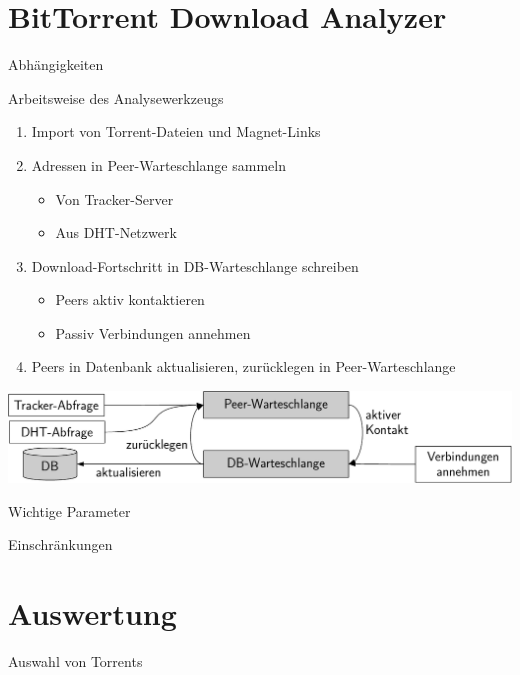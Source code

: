 \documentclass[dvipsnames]{beamer} %
\begin{document}
	\section{BitTorrent Download Analyzer}
	\begin{frame}{Abhängigkeiten}
	\end{frame}

	\begin{frame}{Arbeitsweise des Analysewerkzeugs}
		\begin{enumerate}
			\item \alert{Import} von Torrent-Dateien und Magnet-Links
			\item \alert{Adressen} in Peer-Warteschlange sammeln
			\begin{itemize}
				\item Von Tracker-Server
				\item Aus DHT-Netzwerk
			\end{itemize}
			\item \alert{Download-Fortschritt} in DB-Warteschlange schreiben
			\begin{itemize}
				\item Peers aktiv kontaktieren
				\item Passiv Verbindungen annehmen
			\end{itemize}
			\item Peers in \alert{Datenbank} aktualisieren, zurücklegen in Peer-Warteschlange
		\end{enumerate}

		\vspace{0.4cm}
    \includegraphics[width=\textwidth]{002_Komponenten-crop}
	\end{frame}

	\begin{frame}{Wichtige Parameter}
	\end{frame}

	\begin{frame}{Einschränkungen}
	\end{frame}

	\section{Auswertung}
	\begin{frame}{Auswahl von Torrents}
	\end{frame}
\end{document}
